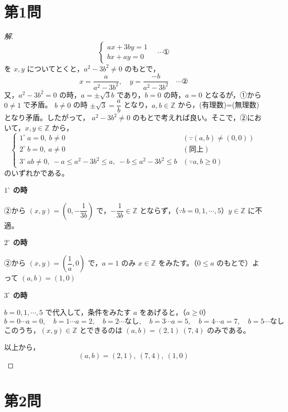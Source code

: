 \documentclass[../main.tex]{subfiles}
\begin{document}
\section*{第1問}

\begin{proof}[解]
  \[
    \begin{cases}
      ax+3by=1 \\
      bx+ay=0
    \end{cases}
    \quad \cdots \text{①}
  \]
  を $x,y$ についてとくと，$a^2-3b^2\ne0$ のもとで，
  \[
    x=\frac{a}{a^2-3b^2}, \quad y=\frac{-b}{a^2-3b^2} \quad \cdots \text{②}
  \]
  又，$a^2-3b^2=0$ の時，$a=\pm\sqrt3 b$ であり，$b=0$ の時，$a=0$ となるが，①から $0\ne1$ で矛盾。
  $b\ne0$ の時 $\pm\sqrt3=\dfrac{a}{b}$ となり，$a,b\in\mathbb{Z}$ から，(有理数)=(無理数) となり矛盾。したがって，
  $a^2-3b^2\ne0$ のもとで考えれば良い。そこで，②において，$x,y\in\mathbb{Z}$ から，
  \[
    \begin{cases}
      1^\circ\ a=0,\ b\ne0 & (\because(a,b)\ne(0,0)) \\
      2^\circ\ b=0,\ a\ne0 & (\text{同上}) \\
      3^\circ\ ab\ne0,\ -a\le a^2-3b^2\le a,\ -b\le a^2-3b^2\le b & (\because a,b\ge0)
    \end{cases}
  \]
  のいずれかである。

  \textbf{$1^\circ$ の時}

  ②から $(x,y)=\left(0,-\dfrac{1}{3b}\right)$ で，$-\dfrac{1}{3b}\in\mathbb{Z}$ とならず，（$\because b=0,1,\cdots,5$）$y\in\mathbb{Z}$ に不適。

  \textbf{$2^\circ$ の時}

  ②から $(x,y)=\left(\dfrac{1}{a},0\right)$ で，$a=1$ のみ $x\in\mathbb{Z}$ をみたす。（$0\le a$ のもとで）よって $(a,b)=(1,0)$

  \textbf{$3^\circ$ の時}

  $b=0,1,\cdots,5$ で代入して，条件をみたす $a$ をあげると，（$a\ge0$）
  \[
    b=0 \cdots a=0, \quad b=1 \cdots a=2, \quad b=2 \cdots \text{なし}, \quad b=3 \cdots a=5, \quad b=4 \cdots a=7, \quad b=5 \cdots \text{なし}
  \]
  このうち，$(x,y)\in\mathbb{Z}$ とできるのは $(a,b)=(2,1)\ (7,4)$ のみである。

  以上から，
  \[
    (a,b)=(2,1),\ (7,4),\ (1,0)
  \]
\end{proof}

\newpage

\section*{第2問}
\end{document}
